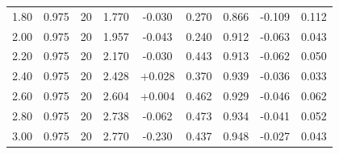 \begin{longtable}{ccccccccc}
1.80 & 0.975 & 20 & 1.770 & -0.030 & 0.270 & 0.866 & -0.109 & 0.112 \\
2.00 & 0.975 & 20 & 1.957 & -0.043 & 0.240 & 0.912 & -0.063 & 0.043 \\
2.20 & 0.975 & 20 & 2.170 & -0.030 & 0.443 & 0.913 & -0.062 & 0.050 \\
2.40 & 0.975 & 20 & 2.428 & +0.028 & 0.370 & 0.939 & -0.036 & 0.033 \\
2.60 & 0.975 & 20 & 2.604 & +0.004 & 0.462 & 0.929 & -0.046 & 0.062 \\
2.80 & 0.975 & 20 & 2.738 & -0.062 & 0.473 & 0.934 & -0.041 & 0.052 \\
3.00 & 0.975 & 20 & 2.770 & -0.230 & 0.437 & 0.948 & -0.027 & 0.043 \\
\end{longtable}